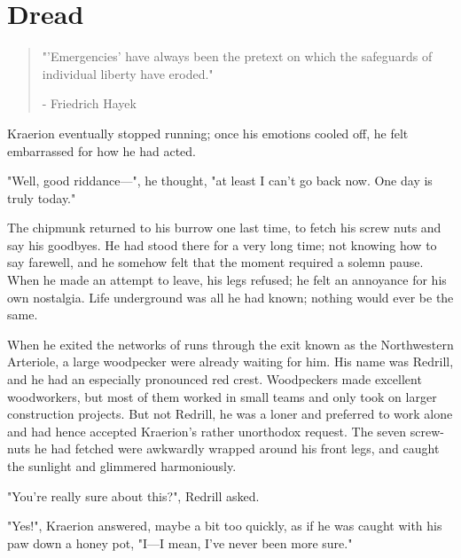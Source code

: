 \chapter{Dread}

\vspace{-1.3cm}
\begin{localsize}{10}
	\begin{quote}
		"'Emergencies' have always been the pretext on which the safeguards of individual liberty have eroded."
		\begin{flushright}- Friedrich Hayek\end{flushright}
	\end{quote} 
\end{localsize}
\vspace{1cm}

\renewcommand*{\thepage}{\footnotesize \hexadecimal{page}}

Kraerion eventually stopped running; once his emotions cooled off, he felt embarrassed for how he had acted. 

"Well, good riddance---", he thought, "at least I can't go back now. One day is truly today."

The chipmunk returned to his burrow one last time, to fetch his screw nuts and say his goodbyes. He had stood there for a very long time; not knowing how to say farewell, and he somehow felt that the moment required a solemn pause. When he made an attempt to leave, his legs refused; he felt an annoyance for his own nostalgia. Life underground was all he had known; nothing would ever be the same.

When he exited the networks of runs through the exit known as the Northwestern Arteriole, a large woodpecker were already waiting for him. His name was Redrill, and he had an especially pronounced red crest. Woodpeckers made excellent woodworkers, but most of them worked in small teams and only took on larger construction projects. But not Redrill, he was a loner and preferred to work alone and had hence accepted Kraerion's rather unorthodox request. The seven screw-nuts he had fetched were awkwardly wrapped around his front legs, and caught the sunlight and glimmered harmoniously. 

\renewcommand*{\thepage}{\footnotesize \arabic{page}}

"You're really sure about this?", Redrill asked.

"Yes!", Kraerion answered, maybe a bit too quickly, as if he was caught with his paw down a honey pot, "I---I mean, I've never been more sure."

